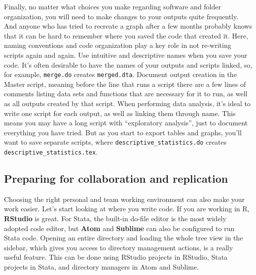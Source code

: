 Finally, no matter what choices you make regarding software and folder organization,
you will need to make changes to your outputs quite frequently.
And anyone who has tried to recreate a graph after a few months probably knows
that it can be hard to remember where you saved the code that created it.
Here, naming conventions and code organization play a key role in not re-writing scripts again and again.
Use intuitive and descriptive names when you save your code.
It's often desirable to have the names of your outputs and scripts linked,
so, for example, \texttt{merge.do} creates \texttt{merged.dta}.
Document output creation in the Master script,
meaning before the line that runs a script there are a few lines of comments listing
data sets and functions that are necessary for it to run,
as well as all outputs created by that script.
When performing data analysis,
it's ideal to write one script for each output,
as well as linking them through name.
This means you may have a long script with ``exploratory analysis'',
just to document everything you have tried.
But as you start to export tables and graphs,
you'll want to save separate scripts, where
\texttt{descriptive\_statistics.do} creates \texttt{descriptive\_statistics.tex}.

\subsection{Preparing for collaboration and replication}

Choosing the right personal and team working environment can also make your work easier.
Let's start looking at where you write code.
If you are working in R, \textbf{RStudio} is great.
For Stata, the built-in do-file editor is the most widely adopted code editor,
but \textbf{Atom} and \textbf{Sublime} can also be configured to run Stata code.
Opening an entire directory and loading the whole tree view in the sidebar,
which gives you access to directory management actions, is a really useful feature.
This can be done using RStudio projects in RStudio, Stata projects in Stata, and directory managers in Atom and Sublime.


